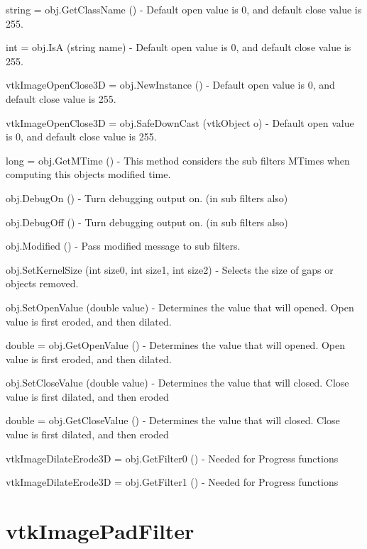 \begin{DoxyItemize}
\item {\ttfamily string = obj.\-Get\-Class\-Name ()} -\/ Default open value is 0, and default close value is 255.  
\item {\ttfamily int = obj.\-Is\-A (string name)} -\/ Default open value is 0, and default close value is 255.  
\item {\ttfamily vtk\-Image\-Open\-Close3\-D = obj.\-New\-Instance ()} -\/ Default open value is 0, and default close value is 255.  
\item {\ttfamily vtk\-Image\-Open\-Close3\-D = obj.\-Safe\-Down\-Cast (vtk\-Object o)} -\/ Default open value is 0, and default close value is 255.  
\item {\ttfamily long = obj.\-Get\-M\-Time ()} -\/ This method considers the sub filters M\-Times when computing this objects modified time.  
\item {\ttfamily obj.\-Debug\-On ()} -\/ Turn debugging output on. (in sub filters also)  
\item {\ttfamily obj.\-Debug\-Off ()} -\/ Turn debugging output on. (in sub filters also)  
\item {\ttfamily obj.\-Modified ()} -\/ Pass modified message to sub filters.  
\item {\ttfamily obj.\-Set\-Kernel\-Size (int size0, int size1, int size2)} -\/ Selects the size of gaps or objects removed.  
\item {\ttfamily obj.\-Set\-Open\-Value (double value)} -\/ Determines the value that will opened. Open value is first eroded, and then dilated.  
\item {\ttfamily double = obj.\-Get\-Open\-Value ()} -\/ Determines the value that will opened. Open value is first eroded, and then dilated.  
\item {\ttfamily obj.\-Set\-Close\-Value (double value)} -\/ Determines the value that will closed. Close value is first dilated, and then eroded  
\item {\ttfamily double = obj.\-Get\-Close\-Value ()} -\/ Determines the value that will closed. Close value is first dilated, and then eroded  
\item {\ttfamily vtk\-Image\-Dilate\-Erode3\-D = obj.\-Get\-Filter0 ()} -\/ Needed for Progress functions  
\item {\ttfamily vtk\-Image\-Dilate\-Erode3\-D = obj.\-Get\-Filter1 ()} -\/ Needed for Progress functions  
\end{DoxyItemize}\hypertarget{vtkimaging_vtkimagepadfilter}{}\section{vtk\-Image\-Pad\-Filter}\label{vtkimaging_vtkimagepadfilter}
